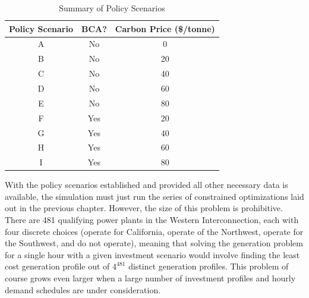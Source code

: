 \begin{table}
    \centering
    \caption{Summary of Policy Scenarios \label{policy_scenarios}}
    \begin{tabular}{c c c}
        \hline\hline
        Policy Scenario & BCA? & Carbon Price (\$/tonne)\\
        \hline
        A & No & 0\\
        B & No & 20\\
        C & No & 40\\
        D & No & 60\\
        E & No & 80\\
        F & Yes & 20 \\
        G & Yes & 40 \\
        H & Yes & 60 \\
        I & Yes & 80 \\
    \hline    
    \end{tabular}
\end{table}

With the policy scenarios established and provided all other necessary data is available, the simulation must just run the series of constrained optimizations laid out in the previous chapter. However, the size of this problem is prohibitive. There are 481 qualifying power plants in the Western Interconnection, each with four discrete choices (operate for California, operate of the Northwest, operate for the Southwest, and do not operate), meaning that solving the generation problem for a single hour with a given investment scenario would involve finding the least cost generation profile out of $4^{481}$ distinct generation profiles. This problem of course grows even larger when a large number of investment profiles and hourly demand schedules are under consideration. 

